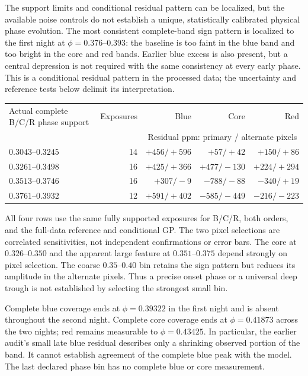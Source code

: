 The support limits and conditional residual pattern can be localized, but
the available noise controls do not establish a unique, statistically
calibrated physical phase evolution. The most consistent complete-band sign
pattern is localized to the first
night at $\phi=0.376$--$0.393$: the baseline is too faint in the blue band
and too bright in the core and red bands. Earlier blue excess is also present,
but a central depression is not required with the same consistency at every
early phase. This is a conditional residual pattern in the processed data;
the uncertainty and reference tests below delimit its interpretation.

\begin{center}
\small
\begin{tabular}{lrrrr}
\toprule
Actual complete B/C/R phase support & Exposures & Blue & Core & Red\\
 & & \multicolumn{3}{c}{Residual ppm: primary / alternate pixels}\\
\midrule
$0.3043$--$0.3245$ & 14 & $+456/+596$ & $+57/+42$ & $+150/+86$\\
$0.3261$--$0.3498$ & 16 & $+425/+366$ & $+477/-130$ & $+224/+294$\\
$0.3513$--$0.3746$ & 16 & $+307/-9$ & $-788/-88$ & $-340/+19$\\
$0.3761$--$0.3932$ & 12 & $+591/+402$ & $-585/-449$ & $-216/-223$\\
\bottomrule
\end{tabular}
\end{center}
All four rows use the same fully supported exposures for B/C/R, both orders,
and the full-data reference and conditional GP. The two pixel selections
are correlated sensitivities, not independent confirmations or error bars.
The core at $0.326$--$0.350$ and the apparent large feature at
$0.351$--$0.375$ depend strongly on pixel selection. The coarse
$0.35$--$0.40$ bin retains the sign pattern but reduces its amplitude in
the alternate pixels. Thus a precise onset phase or a universal deep trough
is not established by selecting the strongest small bin.

Complete blue coverage ends at $\phi=0.39322$ in the first night and is
absent throughout the second night. Complete core coverage ends at
$\phi=0.41873$ across the two nights; red remains measurable to
$\phi=0.43425$. In particular, the earlier audit's small late blue residual
describes only a shrinking observed portion of the band. It cannot establish
agreement of the complete blue peak with the model. The last declared phase
bin has no complete blue or core measurement.

